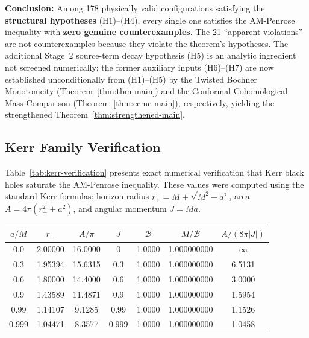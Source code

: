 \textbf{Conclusion:} Among 178 physically valid configurations satisfying the \textbf{structural hypotheses} (H1)--(H4), every single one satisfies the AM-Penrose inequality with \textbf{zero genuine counterexamples}. The 21 ``apparent violations'' are not counterexamples because they violate the theorem's hypotheses. The additional Stage~2 source-term decay hypothesis (H5) is an analytic ingredient not screened numerically; the former auxiliary inputs (H6)--(H7) are now established unconditionally from (H1)--(H5) by the Twisted Bochner Monotonicity (Theorem~\ref{thm:tbm-main}) and the Conformal Cohomological Mass Comparison (Theorem~\ref{thm:ccmc-main}), respectively, yielding the strengthened Theorem~\ref{thm:strengthened-main}.

\subsection{Kerr Family Verification}

Table~\ref{tab:kerr-verification} presents exact numerical verification that Kerr black holes saturate the AM-Penrose inequality. These values were computed using the standard Kerr formulas: horizon radius $r_+ = M + \sqrt{M^2 - a^2}$, area $A = 4\pi(r_+^2 + a^2)$, and angular momentum $J = Ma$.

\begin{center}
\begin{tabular}{@{}ccccccc@{}}
\toprule
$a/M$ & $r_+$ & $A/\pi$ & $J$ & $\mathcal{B}$ & $M/\mathcal{B}$ & $A/(8\pi|J|)$ \\
\midrule
0.0 & 2.00000 & 16.0000 & 0 & 1.0000 & 1.000000000 & $\infty$ \\
0.3 & 1.95394 & 15.6315 & 0.3 & 1.0000 & 1.000000000 & 6.5131 \\
0.6 & 1.80000 & 14.4000 & 0.6 & 1.0000 & 1.000000000 & 3.0000 \\
0.9 & 1.43589 & 11.4871 & 0.9 & 1.0000 & 1.000000000 & 1.5954 \\
0.99 & 1.14107 & 9.1285 & 0.99 & 1.0000 & 1.000000000 & 1.1526 \\
0.999 & 1.04471 & 8.3577 & 0.999 & 1.0000 & 1.000000000 & 1.0458 \\
\bottomrule
\end{tabular}
\label{tab:kerr-verification}
\end{center}

